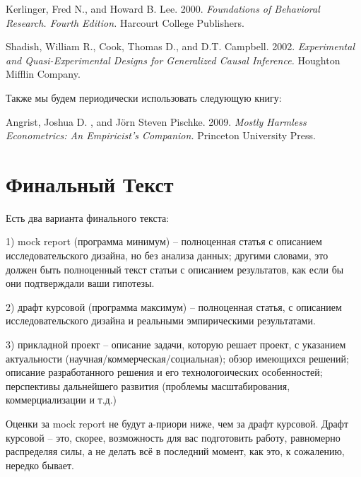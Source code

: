 \documentclass[12pt]{article}
\begin{document}
Kerlinger,  Fred N.,  and Howard B.  Lee.  2000.  \textit{Foundations of Behavioral Research. Fourth Edition.} Harcourt College Publishers. 

Shadish, William R., Cook, Thomas D., and D.T. Campbell. 2002. \textit{Experimental and Quasi-Experimental Designs for Generalized Causal Inference.} Houghton Mifflin Company. 

Также мы будем периодически использовать следующую книгу:

Angrist,  Joshua D. ,  and J\"orn  Steven Pischke.  2009.  \textit{Mostly Harmless Econometrics: An Empiricist's Companion.} Princeton University Press. 
\section*{Финальный Текст}
Есть два варианта финального текста:

1) mock report (программа минимум) -- полноценная статья с описанием исследовательского дизайна,  но без анализа данных; другими словами,  это должен быть полноценный текст статьи с описанием результатов, как если бы они подтверждали ваши гипотезы. 

2) драфт курсовой (программа максимум) -- полноценная статья,  с описанием исследовательского дизайна и реальными эмпирическими результатами.  

3) прикладной проект -- описание задачи, которую решает проект, с указанием актуальности (научная/коммерческая/социальная); обзор имеющихся решений; описание разработанного решения и его технологоических особенностей; перспективы дальнейшего развития (проблемы масштабирования, коммерциализации и т.д.) 

Оценки за mock report не будут а-приори ниже,  чем за драфт курсовой.  Драфт курсовой -- это,  скорее,  возможность для вас подготовить работу,  равномерно распределяя силы, а не делать всё в последний момент,  как это,  к сожалению, нередко бывает. 
\end{document}
